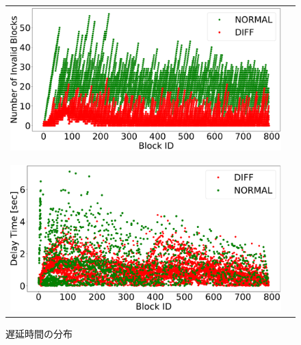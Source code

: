 \documentclass[a4j,12pt]{gradthesis_utf8}
\begin{document}
\clearpage

\begin{figure}[ht]
	\begin{tabular}{cc}
		\begin{minipage}[t]{0.9\hsize}
			\centering
			\includegraphics[width=15cm]{figure/allNSB.pdf}
			\caption{非有効ブロック数の分布}
			\label{allnsb}
		\end{minipage}\\ \\ \\
		\begin{minipage}[t]{0.9\hsize}
			\centering
			\includegraphics[width=15cm]{figure/allADT.pdf}
			\caption{遅延時間の分布}
			\label{alladt}
		\end{minipage}
	\end{tabular}
\end{figure}

\clearpage
\end{document}
